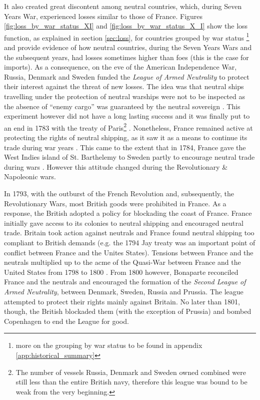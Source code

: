 \documentclass[12pt,a4paper,notitlepage,english]{article}
\begin{document}
It also created great discontent among neutral countries, which, during Seven Years War, experienced losses similar to those of France. Figures \ref{fig:loss_by_war_status_XI} and \ref{fig:loss_by_war_status_X_I} show the loss function, as explained in section \ref{sec:loss}, for countries grouped by war status \footnote{more on the grouping by war status to be found in appendix \ref{app:historical_summary}} and provide evidence of how neutral countries, during the Seven Years Wars and the subsequent years, had losses sometimes higher than foes (this is the case for imports). 
As a consequence, on the eve of the American Independence War, Russia, Denmark and Sweden funded the \textit{League of Armed Neutrality} to protect their interest against the threat of new losses.
The idea was that neutral ships travelling under the protection of neutral warships were not to be inspected as the absence of ``enemy cargo'' was guaranteed by the neutral sovereign \cite[p. 121-125]{Schnakenbourg2013}.
This experiment however did not have a long lasting success and it was finally put to an end in 1783 with the treaty of Paris\footnote{The number of vessels Russia, Denmark and Sweden owned combined were still less than the entire British navy, therefore this league was bound to be weak from the very beginning.} \citep{Griffiths1971}.
Nonetheless, France remained active at protecting the rights of neutral shipping, as it saw it as a means to continue its trade during war years \cite[p. 129]{Schnakenbourg2013}. This came to the extent that in 1784, France gave the West Indies island of St. Barthelemy to Sweden partly to encourage neutral trade during wars \cite[p. 326]{Schnakenbourg2013}.
However this attitude changed during the Revolutionary \& Napoleonic wars.

In 1793, with the outburst of the French Revolution and, subsequently, the Revolutionary Wars, most British goods were prohibited in France.
As a response, the British adopted a policy for blockading the coast of France.
France initially gave access to its colonies to neutral shipping and encouraged neutral trade.
Britain took action against neutrals and France found neutral shipping too compliant to British demands (e.g. the 1794 Jay treaty was an important point of conflict between France and the Unites States).
Tensions between France and the neutrals multiplied up to the acme of the Quasi-War between France and the United States from 1798 to 1800 \cite[pp. 106-118]{Marzagalli2015a}. 
From 1800 however, Bonaparte reconciled France and the neutrals and encouraged the formation of the \textit{Second League of Armed Neutrality}, between Denmark, Sweden, Russia and Prussia.
The league attempted to protect their rights mainly against Britain. 
No later than 1801, though, the British blockaded them (with the exception of Prussia) and bombed Copenhagen to end the League for good.
\end{document}
